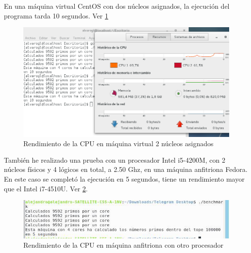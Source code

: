 En una máquina virtual CentOS con dos núcleos asignados, la ejecución del programa tarda 10 segundos. Ver \ref{cuestion5-04}

\begin{figure}[H]
	\centering
	\includegraphics[scale=0.4]{cuestion5-04.png}
	\caption{Rendimiento de la CPU en máquina virtual 2 núcleos asignados} \label{cuestion5-04}
\end{figure}

También he realizado una prueba con un procesador Intel i5-4200M, con 2 núcleos físicos y 4 lógicos en total, a 2.50 Ghz, en una máquina anfitriona Fedora.
En este caso se completó la ejecución en 5 segundos, tiene un rendimiento mayor que el Intel i7-4510U. Ver \ref{cuestion5-05}.

\begin{figure}[H]
	\centering
	\includegraphics[scale=0.6]{cuestion5-05.png}
	\caption{Rendimiento de la CPU en máquina anfitriona con otro procesador} \label{cuestion5-05}
\end{figure}

\newpage



